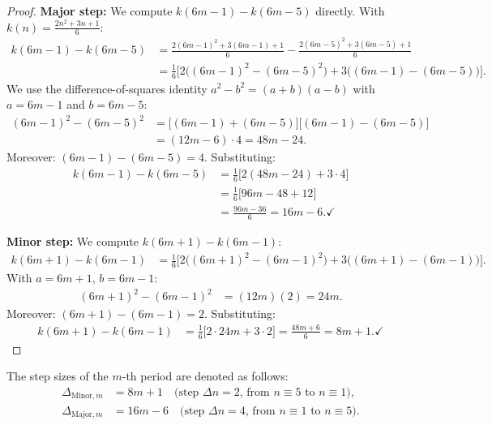 \begin{proof}
\textbf{Major step:} We compute $k(6m-1) - k(6m-5)$ directly.
With $k(n) = \frac{2n^2+3n+1}{6}$:
\begin{align*}
  k(6m-1) - k(6m-5)
  &= \frac{2(6m-1)^2 + 3(6m-1) + 1}{6}
   - \frac{2(6m-5)^2 + 3(6m-5) + 1}{6} \\[4pt]
  &= \frac{1}{6}\bigl[2\bigl((6m-1)^2 - (6m-5)^2\bigr)
     + 3\bigl((6m-1) - (6m-5)\bigr)\bigr].
\end{align*}
We use the difference-of-squares identity $a^2 - b^2 = (a+b)(a-b)$
with $a = 6m-1$ and $b = 6m-5$:
\begin{align*}
  (6m-1)^2 - (6m-5)^2
  &= \bigl[(6m-1)+(6m-5)\bigr]\bigl[(6m-1)-(6m-5)\bigr] \\
  &= (12m-6)\cdot 4
  = 48m - 24.
\end{align*}
Moreover: $(6m-1)-(6m-5) = 4$. Substituting:
\begin{align*}
  k(6m-1) - k(6m-5)
  &= \frac{1}{6}\bigl[2(48m-24) + 3 \cdot 4\bigr] \\
  &= \frac{1}{6}\bigl[96m - 48 + 12\bigr] \\
  &= \frac{96m - 36}{6}
  = 16m - 6. \checkmark
\end{align*}

\textbf{Minor step:} We compute $k(6m+1) - k(6m-1)$:
\begin{align*}
  k(6m+1) - k(6m-1)
  &= \frac{1}{6}\bigl[2\bigl((6m+1)^2 - (6m-1)^2\bigr)
     + 3\bigl((6m+1) - (6m-1)\bigr)\bigr].
\end{align*}
With $a = 6m+1$, $b = 6m-1$:
\begin{align*}
  (6m+1)^2 - (6m-1)^2
  &= (12m)(2) = 24m.
\end{align*}
Moreover: $(6m+1)-(6m-1) = 2$. Substituting:
\begin{align*}
  k(6m+1) - k(6m-1)
  &= \frac{1}{6}\bigl[2 \cdot 24m + 3 \cdot 2\bigr]
  = \frac{48m + 6}{6}
  = 8m + 1. \checkmark
\end{align*}
\end{proof}

\begin{definition}\label{def:minor_major}
The step sizes of the $m$-th period are denoted as follows:
\begin{align}
  \Delta_{\mathrm{Minor},m} &= 8m + 1 \quad
    \text{(step $\Delta n = 2$, from } n\equiv5 \text{ to } n\equiv1\text{)},\\
  \Delta_{\mathrm{Major},m} &= 16m - 6 \quad
    \text{(step $\Delta n = 4$, from } n\equiv1 \text{ to } n\equiv5\text{)}.
\end{align}
\end{definition}


